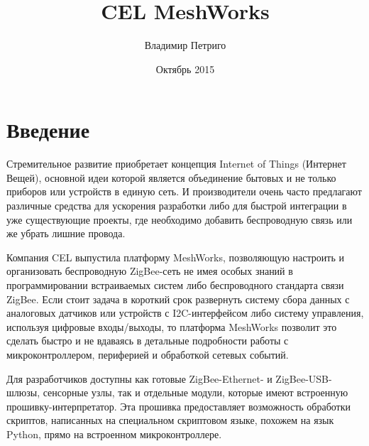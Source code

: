 \documentclass[12pt]{article}
\title{CEL MeshWorks}
\author{Владимир Петриго}
\date{Октябрь 2015}
\begin{document}
\maketitle

\section{Введение}

Стремительное развитие приобретает концепция Internet of Things (Интернет Вещей),
основной идеи которой является объединение бытовых и не только приборов или 
устройств в единую сеть. И производители очень часто предлагают различные 
средства для ускорения разработки либо для быстрой интеграции в уже существующие 
проекты, где необходимо добавить беспроводную связь или же убрать лишние провода.

Компания CEL выпустила платформу MeshWorks, позволяющую настроить и организовать 
беспроводную ZigBee-сеть не имея особых знаний в программировании встраиваемых систем
либо беспроводного стандарта связи ZigBee. Если стоит задача в короткий срок развернуть
систему сбора данных с аналоговых датчиков или устройств с I2C-интерфейсом либо 
систему управления, используя цифровые входы/выходы, то платформа MeshWorks позволит
это сделать быстро и не вдаваясь в детальные подробности работы с микроконтроллером, 
периферией и обработкой сетевых событий.

Для разработчиков доступны как готовые ZigBee-Ethernet- и ZigBee-USB-шлюзы, 
сенсорные узлы, так и отдельные модули, которые имеют встроенную 
прошивку-интерпретатор. Эта прошивка предоставляет возможность обработки скриптов, 
написанных на специальном скриптовом языке, похожем на язык Python, прямо на 
встроенном микроконтроллере. 
\end{document}
